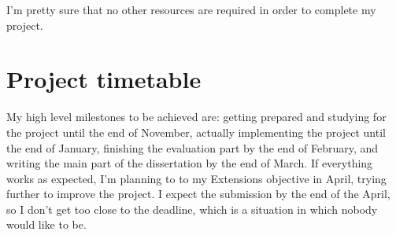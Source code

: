 I'm pretty sure that no other resources are required in order to complete my project.

\section*{Project timetable}

My high level milestones to be achieved are: getting prepared and studying for the project until the end of November, actually implementing the project until the end of January, finishing the evaluation part by the end of February, and writing the main part of the dissertation by the end of March. If everything works as expected, I'm planning to to my Extensions objective in April, trying further to improve the project. I expect the submission by the end of the April, so I don't get too close to the deadline, which is a situation in which nobody would like to be. \\

